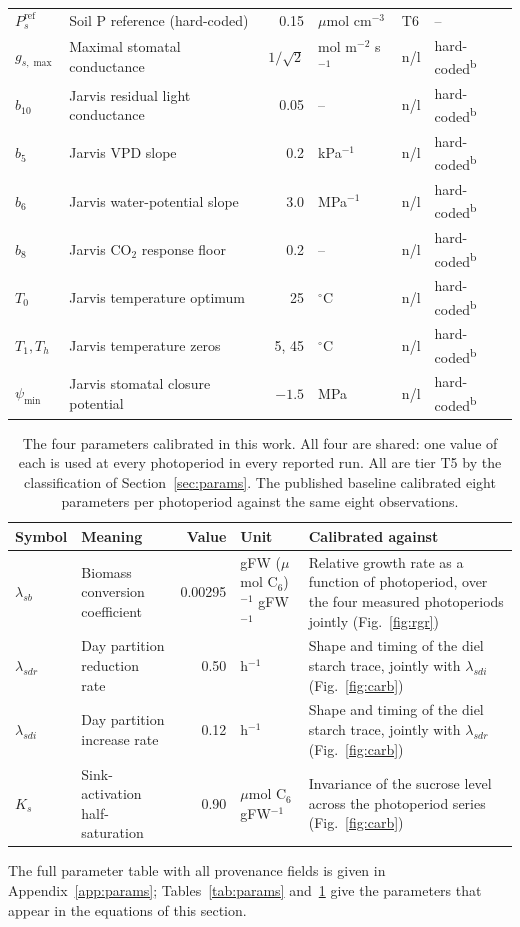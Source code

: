 \begin{table}[!htbp]
\begin{tabular}{@{}llrlll@{}}
$P_s^{\mathrm{ref}}$ & Soil P reference (hard-coded) & 0.15 & $\mu$mol cm$^{-3}$ & T6 & -- \\
$g_{s,\max}$ & Maximal stomatal conductance & $1/\sqrt{2}$ & mol m$^{-2}$ s$^{-1}$ & n/l & hard-coded\textsuperscript{b} \\
$b_{10}$ & Jarvis residual light conductance & 0.05 & -- & n/l & hard-coded\textsuperscript{b} \\
$b_5$ & Jarvis VPD slope & 0.2 & kPa$^{-1}$ & n/l & hard-coded\textsuperscript{b} \\
$b_6$ & Jarvis water-potential slope & 3.0 & MPa$^{-1}$ & n/l & hard-coded\textsuperscript{b} \\
$b_8$ & Jarvis CO$_2$ response floor & 0.2 & -- & n/l & hard-coded\textsuperscript{b} \\
$T_0$ & Jarvis temperature optimum & 25 & $^\circ$C & n/l & hard-coded\textsuperscript{b} \\
$T_1,T_h$ & Jarvis temperature zeros & 5, 45 & $^\circ$C & n/l & hard-coded\textsuperscript{b} \\
$\psi_{\min}$ & Jarvis stomatal closure potential & $-1.5$ & MPa & n/l & hard-coded\textsuperscript{b} \\
\bottomrule
\end{tabular}
\end{table}

\begin{table}[!htbp]
\centering
\small
\caption{The four parameters calibrated in this work. All four are shared: one
value of each is used at every photoperiod in every reported run. All are tier T5
by the classification of Section~\ref{sec:params}. The published baseline
calibrated eight parameters per photoperiod against the same eight observations.}
\label{tab:fitted}
\begin{tabular}{@{}llrlp{38mm}@{}}
\toprule
Symbol & Meaning & Value & Unit & Calibrated against \\
\midrule
$\lambda_{sb}$ & Biomass conversion coefficient & 0.00295 & gFW ($\mu$mol C$_6$)$^{-1}$ gFW$^{-1}$ & Relative growth rate as a function of photoperiod, over the four measured photoperiods jointly (Fig.~\ref{fig:rgr}) \\[2pt]
$\lambda_{sdr}$ & Day partition reduction rate & 0.50 & h$^{-1}$ & Shape and timing of the diel starch trace, jointly with $\lambda_{sdi}$ (Fig.~\ref{fig:carb}) \\[2pt]
$\lambda_{sdi}$ & Day partition increase rate & 0.12 & h$^{-1}$ & Shape and timing of the diel starch trace, jointly with $\lambda_{sdr}$ (Fig.~\ref{fig:carb}) \\[2pt]
$K_s$ & Sink-activation half-saturation & 0.90 & $\mu$mol C$_6$ gFW$^{-1}$ & Invariance of the sucrose level across the photoperiod series (Fig.~\ref{fig:carb}) \\[2pt]
\bottomrule
\end{tabular}
\end{table}

The full parameter table with all provenance fields is given in
Appendix~\ref{app:params}; Tables~\ref{tab:params} and~\ref{tab:fitted} give the
parameters that appear in the equations of this section.
